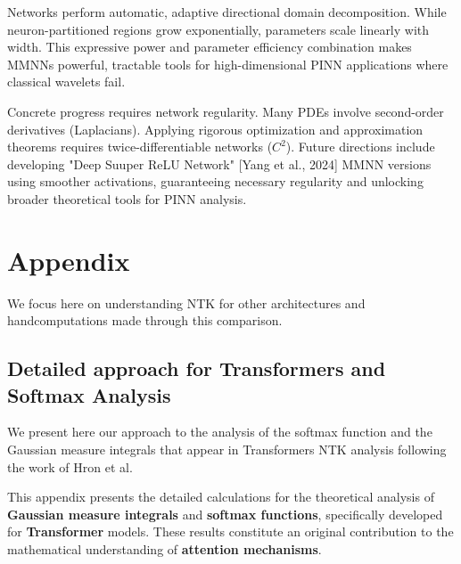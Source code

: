 \documentclass[a4paper]{article}
\theoremstyle{plain}
\theoremstyle{definition}
\theoremstyle{remark}
\begin{document}
Networks perform automatic, adaptive directional domain decomposition. While neuron-partitioned regions grow exponentially, parameters scale linearly with width. This expressive power and parameter efficiency combination makes MMNNs powerful, tractable tools for high-dimensional PINN applications where classical wavelets fail.

Concrete progress requires network regularity. Many PDEs involve second-order derivatives (Laplacians). Applying rigorous optimization and approximation theorems requires twice-differentiable networks ($C^2$). Future directions include developing "Deep Suuper ReLU Network" [Yang et al., 2024] MMNN versions using smoother activations, guaranteeing necessary regularity and unlocking broader theoretical tools for PINN analysis.









\newpage

\appendix
\section{Appendix}


We focus here on understanding NTK for other architectures and handcomputations made through this comparison.


\subsection{Detailed approach for Transformers and Softmax Analysis}
\label{app:transformers}

We present here our approach to the analysis of the softmax function and the Gaussian measure integrals that appear in Transformers NTK analysis following the work of Hron et al.

\begin{tcolorbox}[colback=personalcontribcolor!15,colframe=personalcontribcolor!80!black,title={\textbf{Major Personal Contribution}},enhanced,drop shadow,boxrule=2pt]
This appendix presents the detailed calculations for the theoretical analysis of \textcolor{insightcolor}{\textbf{Gaussian measure integrals}} and \textcolor{methodcolor}{\textbf{softmax functions}}, specifically developed for \textcolor{kernelcolor}{\textbf{Transformer}} models. These results constitute an original contribution to the mathematical understanding of \textcolor{k3color}{\textbf{attention mechanisms}}.
\end{tcolorbox}
\end{document}
